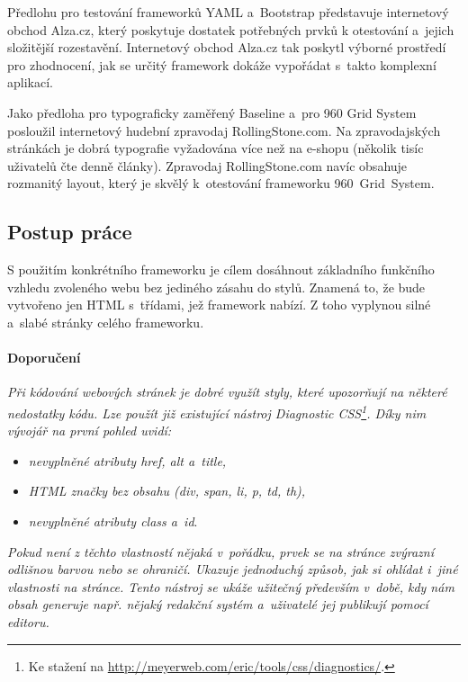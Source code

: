 \documentclass[thesis=B,czech]{FITthesis}[2012/06/26]
\begin{document}
Předlohu pro testování frameworků \gls{YAML} a~Bootstrap představuje internetový obchod Alza.cz, který poskytuje dostatek potřebných prvků k otestování a~jejich složitější rozestavění. Internetový obchod Alza.cz tak poskytl výborné prostředí pro zhodnocení, jak se určitý framework dokáže vypořádat s~takto komplexní aplikací.

Jako předloha pro typograficky zaměřený Baseline a~pro 960 Grid System posloužil internetový hudební zpravodaj RollingStone.com. Na zpravodajských stránkách je dobrá typografie vyžadována více než na e-shopu (několik tisíc uživatelů čte denně články). Zpravodaj RollingStone.com  navíc obsahuje rozmanitý layout, který je skvělý k~otestování frameworku 960~Grid~System. 



\subsection{Postup práce}

S použitím konkrétního frameworku je cílem dosáhnout základního funkčního vzhledu zvoleného webu bez jediného zásahu do stylů. Znamená to, že bude vytvořeno jen \gls{HTML} s~třídami, jež framework nabízí. Z toho vyplynou silné a~slabé stránky celého frameworku. 


\paragraph{Doporučení}

 \textit{Při kódování webových stránek je dobré využít styly, které upozorňují na některé nedostatky kódu. Lze použít již existující nástroj Diagnostic CSS\footnote{Ke stažení na \url{http://meyerweb.com/eric/tools/css/diagnostics/}.}. Díky nim vývojář na první pohled uvidí: }

\begin{itemize}
 \item \textit{nevyplněné atributy href, alt a~title,}
 \item \textit{\gls{HTML} značky bez obsahu (div, span, li, p, td, th),}
 \item \textit{nevyplněné atributy class a~id}.
\end{itemize}
\textit{Pokud není z těchto vlastností nějaká v~pořádku, prvek se na stránce zvýrazní odlišnou barvou nebo se ohraničí. Ukazuje jednoduchý způsob, jak si ohlídat i~jiné vlastnosti na stránce. Tento nástroj se ukáže užitečný především v~době, kdy nám obsah generuje např. nějaký redakční systém a~uživatelé jej publikují pomocí editoru.}
\end{document}
